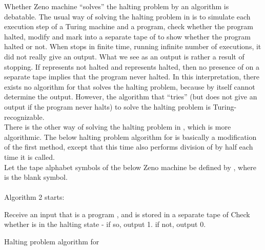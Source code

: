\documentclass{roffin}
\begin{document}
Whether Zeno machine ``solves'' the halting problem by an algorithm is debatable. The usual way of solving the halting problem in  is to simulate each execution step of a Turing machine and a program, check whether the program halted, modify and mark into a separate tape of  to show whether the program halted or not. When  stops in finite time, running infinite number of executions, it did not really give an output. What we see as an output is rather a result of  stopping. If  represents not halted and  represents halted, then no presence of  on a separate tape implies that the program never halted. In this interpretation, there exists no algorithm for  that solves the halting problem, because  by itself cannot determine the output. However, the algorithm that ``tries'' (but does not give an output if the program never halts) to solve the halting problem is Turing-recognizable.\\
There is the other way of solving the halting problem in , which is more algorithmic. The below halting problem algorithm for  is basically a modification of the first method, except that this time  also performs division of  by half each time it is called.\\
Let the tape alphabet symbols of the below Zeno machine be defined by , where  is the blank symbol.\\\\
Algorithm 2 starts:\\
\begin{algorithm}[H]
Receive an input that is a program \;
, and  is stored in a separate tape  of \;
Check whether  is in the halting state - if so, output 1. if not, output 0.\;
\caption{Halting problem algorithm for }
\end{algorithm}
\end{document}
